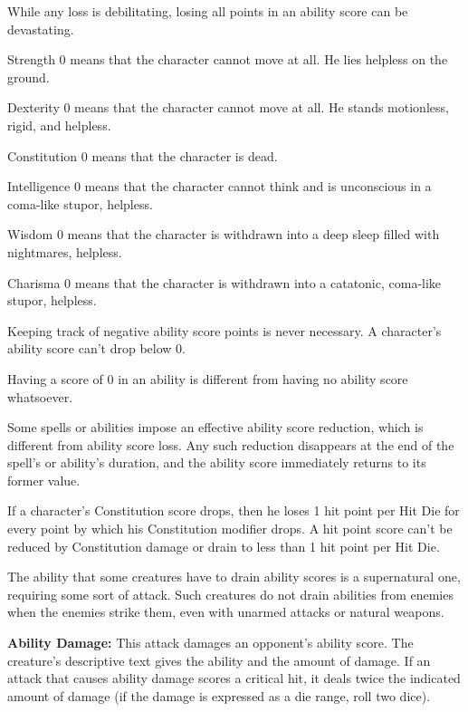 While any loss is debilitating, losing all points in an ability score can be devastating.

\begin{itemize*}
\item Strength 0 means that the character cannot move at all. He lies helpless on the ground.
\item Dexterity 0 means that the character cannot move at all. He stands motionless, rigid, and helpless.
\item Constitution 0 means that the character is dead.
\item Intelligence 0 means that the character cannot think and is unconscious in a coma-like stupor, helpless.
\item Wisdom 0 means that the character is withdrawn into a deep sleep filled with nightmares, helpless.
\item Charisma 0 means that the character is withdrawn into a catatonic, coma-like stupor, helpless.
\end{itemize*}

Keeping track of negative ability score points is never necessary. A character's ability score can't drop below 0.

Having a score of 0 in an ability is different from having no ability score whatsoever.

Some spells or abilities impose an effective ability score reduction, which is different from ability score loss. Any such reduction disappears at the end of the spell's or ability's duration, and the ability score immediately returns to its former value.

If a character's Constitution score drops, then he loses 1 hit point per Hit Die for every point by which his Constitution modifier drops. A hit point score can't be reduced by Constitution damage or drain to less than 1 hit point per Hit Die.

The ability that some creatures have to drain ability scores is a supernatural one, requiring some sort of attack. Such creatures do not drain abilities from enemies when the enemies strike them, even with unarmed attacks or natural weapons.

\textbf{Ability Damage:} This attack damages an opponent's ability score. The creature's descriptive text gives the ability and the amount of damage. If an attack that causes ability damage scores a critical hit, it deals twice the indicated amount of damage (if the damage is expressed as a die range, roll two dice).

